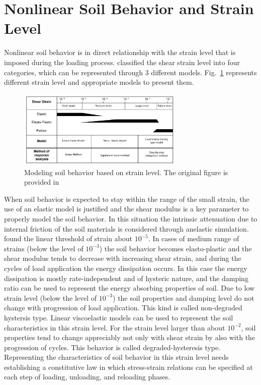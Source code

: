 
\section{Nonlinear Soil Behavior and Strain Level}

Nonlinear soil behavior is in direct relationship with the strain level that is imposed during the loading process. \citet{Ishihara_1996} classified the shear strain level into four categories, which can be represented through 3 different models. Fig.~\ref{fig:ishihara_fig_3p1} represents different strain level and appropriate models to present them.


\begin{figure}
    \centering
    \includegraphics[width=300px]{figures/pdf/ishihara_fig_3p1.pdf}
    \caption{Modeling soil behavior based on strain level. The original figure is provided in  \citet{Ishihara_1996}}
    \label{fig:ishihara_fig_3p1}
\end{figure}



When soil behavior is expected to stay within the range of the small strain, the use of an elastic model is justified and the shear modulus is a key parameter to properly model the soil behavior. In this situation the intrinsic attenuation due to internal friction of the soil materials is considered through anelastic simulation. \citet{Assimaki2000} found the linear threshold of strain about $10^{-5}$. In cases of medium range of strains (below the level of $10^{-3}$) the soil behavior becomes elasto-plastic and the shear modulus tends to decrease with increasing shear strain, and during the cycles of load application the energy dissipation occurs. In this case the energy dissipation is mostly rate-independent and of hysteric nature, and the damping ratio can be used to represent the energy absorbing properties of soil. Due to low strain level (below the level of $10^{-3}$) the soil properties and damping level do not change with progression of load application. This kind is called non-degraded hystersis type. Linear viscoelastic models can be used to represent the soil characteristics in this strain level. For the strain level larger than about $10^{-2}$, soil properties tend to change appreciably not only with shear strain by also with the progression of cycles. This behavior is called degraded-hysteresis type. Representing the characteristics of soil behavior in this strain level needs establishing a constitutive law in which stress-strain relations can be specified at each step of loading, unloading, and reloading phases. 

